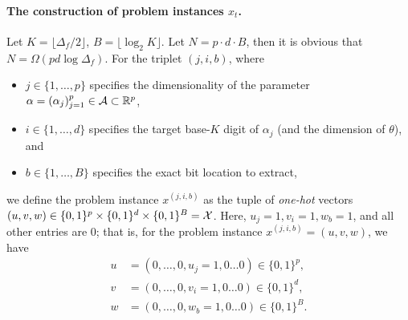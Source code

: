         \paragraph{The construction of problem instances $x_t$.} Let $K = \lfloor \Delta_f / 2\rfloor$, $B = \lfloor \log_2 K\rfloor$. Let $N = p \cdot d \cdot B$, then it is obvious that $N = \Omega(pd \log \Delta_f)$. For the triplet $(j, i, b)$, where
        \begin{itemize}
            \item $j \in \{1, \dots, p\}$ specifies the dimensionality of the parameter $\alpha = (\alpha_j)_{j = 1}^p \in \mathcal{A} \subset \mathbb{R}^p$,
            \item $i \in \{1, \dots, d\}$ specifies the target base-$K$ digit of $\alpha_j$ (and the dimension of $\theta$), and
            \item $b \in \{1, \dots, B\}$ specifies the exact bit location to extract,
        \end{itemize}
        we define the problem instance $x^{(j, i, b)}$ as the tuple of \textit{one-hot} vectors $(u, v, w) \in \{0, 1\}^p \times \{0, 1\}^d \times \{0, 1\}^B = \mathcal{X}$. Here, $u_j = 1, v_i = 1, w_b = 1$, and all other entries are 0; that is, for the problem instance $x^{(j, i, b)} = (u, v, w)$, we have
        \begin{equation*}
            \begin{aligned}
                u &= (0, \dots, 0, u_j = 1, 0\dots 0) \in \{0, 1\}^p, \\
                v &= (0, \dots, 0, v_i= 1, 0\dots 0) \in \{0, 1\}^d, \\
                w &= (0, \dots, 0, w_b = 1, 0\dots 0) \in \{0, 1\}^B.
            \end{aligned}
        \end{equation*}


